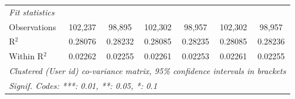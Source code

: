 \begin{table}[htbp]
\begin{threeparttable}[b]
\begin{tabular}{lcccccc}
         \midrule
         \emph{Fit statistics}\\
         Observations                     & 102,237             & 98,895              & 102,302             & 98,957              & 102,302             & 98,957\\  
         R$^2$                            & 0.28076             & 0.28232             & 0.28085             & 0.28235             & 0.28085             & 0.28236\\  
         Within R$^2$                     & 0.02262             & 0.02255             & 0.02261             & 0.02253             & 0.02261             & 0.02255\\  
         \midrule \midrule
         \multicolumn{7}{l}{\emph{Clustered (User id) co-variance matrix, 95\% confidence intervals in brackets}}\\
         \multicolumn{7}{l}{\emph{Signif. Codes: ***: 0.01, **: 0.05, *: 0.1}}\\
      \end{tabular}
   \end{threeparttable}
\end{table}


